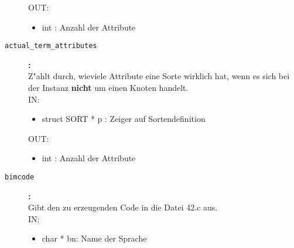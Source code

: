 \begin{description}
\begin{itemize}
\end{itemize}
OUT:
\begin{itemize}
   \item int : Anzahl der Attribute

\end{itemize}

\item[\tt actual\_term\_attributes
]{\bf :\\}
Z"ahlt durch, wieviele Attribute eine Sorte wirklich hat, wenn
 es sich bei der Instanz {\bf nicht} um einen Knoten handelt.
 \\
IN:
\begin{itemize}
   \item struct SORT * p : Zeiger auf Sortendefinition

\end{itemize}
OUT:
\begin{itemize}
   \item int : Anzahl der Attribute

\end{itemize}

\item[\tt bimcode
]{\bf :\\}
Gibt den zu erzeugenden Code in die Datei 42.c aus.
 \\
IN:
\begin{itemize}
   \item char * bn: Name der Sprache


\end{itemize}
\end{description}
